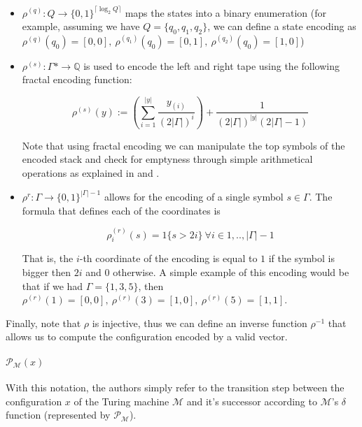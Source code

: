 \documentclass{article}
\begin{document}
\begin{itemize}
    \item $\rho^{(q)}: Q \rightarrow \{0,1\}^{\lceil \log_2 Q \rceil}$ maps the states into a binary enumeration (for example, assuming we have $Q=\{q_0,q_1,q_2\}$, we can define a state encoding as $\rho^{(q)}(q_0)=[0,0],\ \rho^{(q_1)}(q_0)=[0,1],\ \rho^{(q_2)}(q_0)=[1,0]$)
    \item $\rho^{(s)}: \Gamma* \to \mathbb{Q}$ is used to encode the left and right tape using the following fractal encoding function:

        \begin{equation}\label{eq:fractal}
            \rho^{(s)}(y) := \left(\sum_{i=1}^{|y|} \frac{y_{(i)}}{{(2|\Gamma|)^i}}\right) + \frac{1}{(2|\Gamma|)^{|y|}(2|\Gamma|-1)}
        \end{equation}

    Note that using fractal encoding we can manipulate the top symbols of the encoded stack and check for emptyness through simple arithmetical operations as explained in \cite{SIE95} and \cite{SIE995}.
    \item $\rho^{r}:\Gamma \rightarrow \{0,1\}^{|\Gamma|-1}$ allows for the encoding of a single symbol $s \in \Gamma$. The formula that defines each of the coordinates is

        \begin{equation}
            \rho^{(r)}_i(s) = 1\{s > 2i\}\ \forall i \in {1,..,|\Gamma|-1}
        \end{equation}

    That is, the $i$-th coordinate of the encoding is equal to $1$ if the symbol is bigger then $2i$ and $0$ otherwise. A simple example of this encoding would be that if we had $\Gamma=\{1,3,5\}$, then $\rho^{(r)}(1)=[0,0],\ \rho^{(r)}(3)=[1,0],\ \rho^{(r)}(5)=[1,1]$.    
\end{itemize}

Finally, note that $\rho$ is injective, thus we can define an inverse function $\rho^{-1}$ that allows us to compute the configuration encoded by a valid vector.

\paragraph{$\mathcal{P}_{\mathcal{M}}(x)$} With this notation, the authors simply refer to the transition step between the configuration $x$ of the Turing machine $\mathcal{M}$ and it's successor according to $\mathcal{M}$'s $\delta$ function (represented by $\mathcal{P}_{\mathcal{M}}$).
\end{document}
